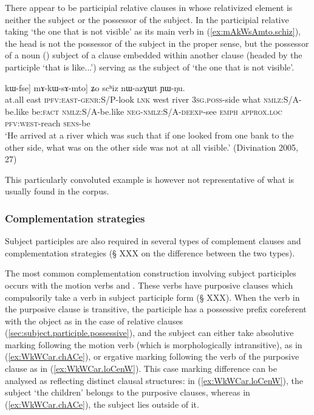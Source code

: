  There appear to be participial relative clauses in  whose relativized element is neither the subject or the possessor of the subject. In the participial relative taking  `the one that is not visible' as its main verb in (\ref{ex:mAkWsAmto.schiz}), the head  is not the possessor of the subject in the proper sense, but the possessor of a noun () subject of a clause embedded within another clause (headed by the participle  `that is like...') serving as the subject of  `the one that is not visible'.  

  \begin{exe}
\ex \label{ex:mAkWsAmto.schiz}
 \gll  [maka tɕɤkɯ ku-kɯ-ru tɕe tɕɤndi smar [[ɯ-βzɯr tɕʰi kɯ-fse ŋu] kɯ-fse] mɤ-kɯ-sɤ-mto] ʑo scʰiz nɯ-azɣɯt ɲɯ-ŋu. \\
 at.all east \textsc{ipfv}:\textsc{east}-\textsc{genr}:S/P-look \textsc{lnk} west river \textsc{3sg}.\textsc{poss}-side what \textsc{nmlz}:S/A-be.like be:\textsc{fact} \textsc{nmlz}:S/A-be.like \textsc{neg}-\textsc{nmlz}:S/A-\textsc{deexp}-see \textsc{emph} \textsc{approx}.\textsc{loc} \textsc{pfv}:\textsc{west}-reach \textsc{sens}-be \\
\glt `He arrived at a river which was such that if one looked from one bank to the other side, what was on the other side was not at all visible.' (Divination 2005, 27)
 \end{exe}
 
 This particularly convoluted example is however not representative of what is usually found in the corpus.
\subsubsection{Complementation strategies}  \label{sec:subject.participle.complementation}
Subject participles are also required in several types of complement clauses and complementation strategies (§ XXX on the difference between the two types).

The most common complementation construction involving subject participles occurs with the motion verbs  and . These verbs have purposive clauses which compulsorily take a verb in subject participle form (§ XXX).  When the verb in the purposive clause is transitive, the participle has a possessive prefix coreferent with the object as in the case of relative clauses (\ref{sec:subject.participle.possessive}), and the subject can either take absolutive marking following the motion verb (which is morphologically intransitive), as in (\ref{ex:WkWCar.chACe}), or ergative  marking following the verb of the purposive clause as in (\ref{ex:WkWCar.loCenW}). This case marking difference can be analysed as reflecting distinct clausal structures: in (\ref{ex:WkWCar.loCenW}), the subject  `the children' belongs to the purposive clauses, whereas in (\ref{ex:WkWCar.chACe}), the subject  lies outside of it.


